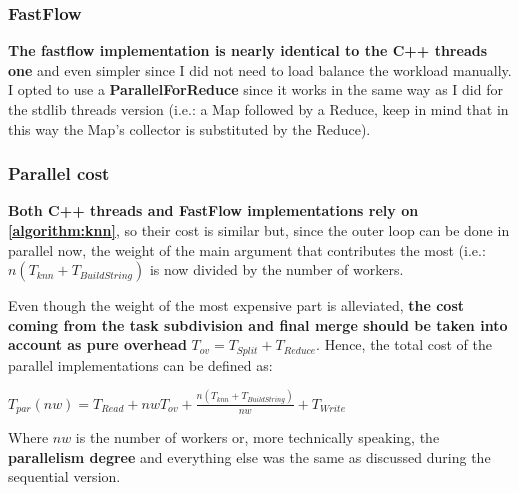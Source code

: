 \subsubsection{FastFlow}
\textbf{The fastflow implementation is nearly identical to the C++ threads one} and even simpler since I did not need to load balance the workload manually. I opted to use a \textbf{ParallelForReduce} since it works in the same way as I did for the stdlib threads version (i.e.: a Map followed by a Reduce, keep in mind that in this way the Map's collector is substituted by the Reduce).

\subsubsection{Parallel cost}
\textbf{Both C++ threads and FastFlow implementations rely on \autoref{algorithm:knn}}, so their cost is similar but, since the outer loop can be done in parallel now, the weight of the main argument that contributes the most (i.e.: $n(T_{knn}+T_{BuildString})$ is now divided by the number of workers.
\vspace{3mm}

Even though the weight of the most expensive part is alleviated, \textbf{the cost coming from the task subdivision and final merge should be taken into account as pure overhead} $T_{ov}=T_{Split}+T_{Reduce}$. Hence, the total cost of the parallel implementations can be defined as:

\begin{center}
\begin{Large}
$T_{par}(nw)=T_{Read}+nwT_{ov}+\frac{n(T_{knn}+T_{BuildString})}{nw}+T_{Write}$
\end{Large}
\end{center}
Where $nw$ is the number of workers or, more technically speaking, the \textbf{parallelism degree} and everything else was the same as discussed during the sequential version.